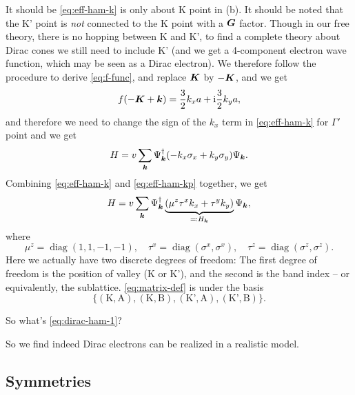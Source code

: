 \documentclass[hyperref, a4paper]{article}
\DeclareMathOperator{\diag}{diag}
\newcommand*{\ii}{\mathrm{i}}
\begin{document}
It should be \eqref{eq:eff-ham-k} is only about K point in (b).
It should be noted that the K' point is \emph{not} connected to the K point with a $\vb*{G}$ factor.
Though in our free theory,
there is no hopping between K and K',
to find a complete theory about Dirac cones 
we still need to include K'
(and we get a 4-component electron wave function,
which may be seen as a Dirac electron).
We therefore follow the procedure to derive \eqref{eq:f-func},
and replace $\vb*{K}$ by $- \vb*{K}$, and we get 
\begin{equation}
    f(- \vb*{K} + \vb*{k}) = \frac{3}{2} k_x a + \ii \frac{3}{2} k_y a,
\end{equation}
and therefore we need to change the sign of the $k_x$ term in \eqref{eq:eff-ham-k} for $\Gamma'$ point 
and we get 
\begin{equation}
    H = v \sum_{\vb*{k}} \Psi^\dagger_{\vb*{k}} (- k_x \sigma_x + k_y \sigma_y) \Psi_{\vb*{k}}.
    \label{eq:eff-ham-kp}
\end{equation}
Combining \eqref{eq:eff-ham-k} and \eqref{eq:eff-ham-kp} together, we get 
\begin{equation}
    H = v \sum_{\vb*{k}} \Psi^\dagger_{\vb*{k}} \underbrace{(\mu^z \tau^x k_x + \tau^y k_y)}_{\eqqcolon H_{\vb*{k}}} \Psi_{\vb*{k}},
    \label{eq:dirac-ham-1}
\end{equation}
where 
\begin{equation}
    \mu^z = \diag(1, 1, -1, -1), \quad 
    \tau^x = \diag(\sigma^x, \sigma^x), \quad 
    \tau^z = \diag(\sigma^z, \sigma^z).
    \label{eq:matrix-def}
\end{equation}
Here we actually have two discrete degrees of freedom:
The first degree of freedom is the position of valley (K or K'),
and the second is the band index -- or equivalently, the sublattice.
\eqref{eq:matrix-def} is under the basis 
\[
    \{
        (\text{K}, \text{A}),
        (\text{K}, \text{B}),
        (\text{K'}, \text{A}),
        (\text{K'}, \text{B})
    \}.
\] 

So what's \eqref{eq:dirac-ham-1}?



So we find indeed Dirac electrons can be realized in a realistic model.

\subsection{Symmetries}
\end{document}
